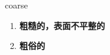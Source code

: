 
\begin{frame}
{\huge coarse}
\begin{center}
\begin{enumerate}\Large
  \item \textbf{粗糙的，表面不平整的}
  \item \textbf{粗俗的}
\end{enumerate}
\end{center}
\end{frame}
